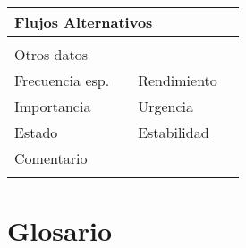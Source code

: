 \documentclass{article}
\begin{document}
\begin{table}[h]
\begin{tabular}{|l|l|l|l|l|l|}
\hline
\multicolumn{6}{|p{10cm}|}{Flujos Alternativos}\\
\hline
\multicolumn{1}{|p{1cm}}{} & \multicolumn{5}{|p{9cm}|}{}\\
\hline
\multicolumn{6}{|p{10cm}|}{Otros datos}\\
\hline
\multicolumn{1}{|p{2cm}|}{Frecuencia esp.} & \multicolumn{2}{p{3cm}}{} & \multicolumn{1}{|p{2cm}|}{Rendimiento} & \multicolumn{2}{p{3cm}|}{}\\
\hline
\multicolumn{1}{|p{2cm}|}{Importancia} & \multicolumn{2}{p{3cm}}{} & \multicolumn{1}{|p{2cm}|}{Urgencia} & \multicolumn{2}{p{3cm}|}{}\\
\hline
\multicolumn{1}{|p{2cm}|}{Estado} & \multicolumn{2}{p{3cm}}{} & \multicolumn{1}{|p{2cm}|}{Estabilidad} & \multicolumn{2}{p{3cm}|}{}\\
\hline
\multicolumn{6}{|p{10cm}|}{Comentario}\\
\hline
\multicolumn{6}{|p{10cm}|}{}\\
\hline
\end{tabular}
\end{table}
\section{Glosario}
\end{document}
